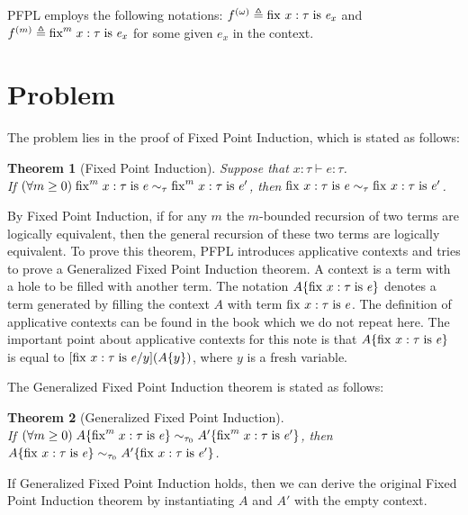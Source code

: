 \documentclass{article}
\newtheorem{theorem}{Theorem}
\begin{document}
PFPL employs the following notations: $f^{(\omega)}\triangleq \mathrm{fix}^{}\;x:\tau\;\mathrm{is}\;\mathit{e_x}$ and $f^{(m)}\triangleq \mathrm{fix}^{m}\;x:\tau\;\mathrm{is}\;\mathit{e_x}$ for some given $e_x$ in the context.


\section{Problem}
\label{sec:problem}


The problem lies in the proof of Fixed Point Induction,
which is stated as follows:

\begin{theorem}[Fixed Point Induction] \label{thm:fpi}
  Suppose that $x:\tau\vdash e:\tau$. \\
  If $(\forall m\ge 0)\;\mathrm{fix}^{m}\;x:\tau\;\mathrm{is}\;\mathit{e} \sim_{\tau} \mathrm{fix}^{m}\;x:\tau\;\mathrm{is}\;\mathit{e'}$,
  then $\mathrm{fix}^{}\;x:\tau\;\mathrm{is}\;\mathit{e}\sim_{\tau}\mathrm{fix}^{}\;x:\tau\;\mathrm{is}\;\mathit{e'}$.
\end{theorem}

By Fixed Point Induction, if for any $m$ the $m$-bounded recursion of two terms are logically equivalent,
then the general recursion of these two terms are logically equivalent.
To prove this theorem, PFPL introduces applicative contexts and tries to prove a Generalized Fixed Point Induction theorem.
A context is a term with a hole to be filled with another term.
The notation $A\{\mathrm{fix}^{}\;x:\tau\;\mathrm{is}\;\mathit{e}\}$ denotes a term generated by filling the context $A$ with term $\mathrm{fix}^{}\;x:\tau\;\mathrm{is}\;\mathit{e}$.
The definition of applicative contexts can be found in the book which we do not repeat here.
The important point about applicative contexts for this note is that $A\{\mathrm{fix}^{}\;x:\tau\;\mathrm{is}\;\mathit{e}\}$ is equal to $[\mathrm{fix}^{}\;x:\tau\;\mathrm{is}\;\mathit{e}/y](A\{y\})$,
where $y$ is a fresh variable.

The Generalized Fixed Point Induction theorem is stated as follows:

\begin{theorem}[Generalized Fixed Point Induction]
  \;\\
  If $(\forall m\ge 0)\;A\{\mathrm{fix}^{m}\;x:\tau\;\mathrm{is}\;\mathit{e}\} \sim_{\tau_0} A'\{\mathrm{fix}^{m}\;x:\tau\;\mathrm{is}\;\mathit{e'}\}$,
  then $A\{\mathrm{fix}^{}\;x:\tau\;\mathrm{is}\;\mathit{e}\}\sim_{\tau_0}A'\{\mathrm{fix}^{}\;x:\tau\;\mathrm{is}\;\mathit{e'}\}$.
\end{theorem}

If Generalized Fixed Point Induction holds, then we can derive the original Fixed Point Induction theorem by
instantiating $A$ and $A'$ with the empty context.
\end{document}
